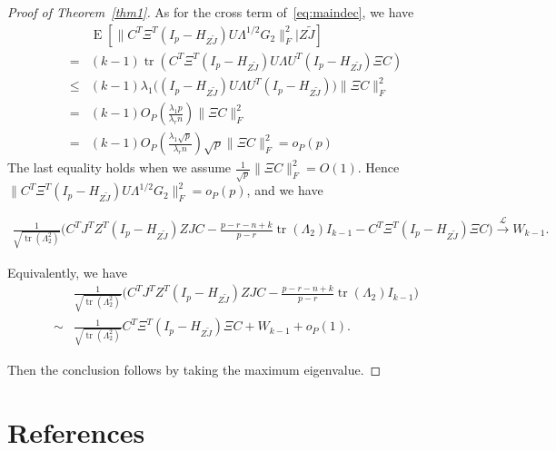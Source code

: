 \documentclass[review]{elsarticle}
\DeclareMathOperator{\mytr}{tr}
\DeclareMathOperator{\myE}{E}
\theoremstyle{plain}
\theoremstyle{definition}
\theoremstyle{remark}
\begin{document}
\begin{proof}[\textrm{Proof of Theorem~\ref{thm1}}]
As for the cross term of~\eqref{eq:maindec}, we have
$$
\begin{aligned}
    &\myE [\|C^T \Xi^T (I_p -H_{Z\tilde{J}})U\Lambda^{1/2}G_2\|_F^2|Z\tilde{J}]\\
    = &
    (k-1)\mytr(C^T \Xi^T (I_p -H_{Z\tilde{J}})U\Lambda U^T (I_p -H_{Z\tilde{J}})\Xi C)\\
    \leq &
    (k-1)\lambda_1\big((I_p -H_{Z\tilde{J}})U\Lambda U^T (I_p -H_{Z\tilde{J}})\big)\|\Xi C\|^2_F\\
    = &
    (k-1) O_P(\frac{\lambda_1 p}{\lambda_r n})  \|\Xi C\|^2_F\\
    = &
    (k-1) O_P(\frac{\lambda_1 \sqrt{p}}{\lambda_r n}) \sqrt{p}  \|\Xi C\|^2_F=o_P(p)
\end{aligned}
$$
The last equality holds when we assume $\frac{1}{\sqrt{p}}\|\Xi C\|_F^2=O(1)$. Hence $\|C^T \Xi^T (I_p -H_{Z\tilde{J}})U\Lambda^{1/2}G_2\|_F^2=o_P(p)$, and we have

$$
\begin{aligned}
\frac{1}{\sqrt{\mytr(\Lambda_2^2)}}
    \big( C^TJ^T Z^T(I_p-H_{Z\tilde J}) ZJC
    -\tfrac{p-r-n+k}{p-r}\mytr(\Lambda_2)I_{k-1} -C^T \Xi^T (I_p-H_{Z\tilde{J}})\Xi C\big)
\xrightarrow{\mathcal{L}} W_{k-1}.
\end{aligned}
$$

    Equivalently, we have
    $$
    \begin{aligned}
        &\frac{1}{\sqrt{\mytr(\Lambda_2^2)}} {\Big(C^TJ^T Z^T(I_p-H_{Z\tilde J}) ZJC- \frac{p-r-n+k}{p-r}\mytr(\Lambda_2)I_{k-1}}\Big)\\
        \sim&
\frac{1}{\sqrt{\mytr(\Lambda_2^2)}} C^T \Xi^T (I_p-H_{Z\tilde{J}})\Xi C
        +W_{k-1}+o_P(1).
    \end{aligned}
    $$

    Then the conclusion follows by taking the maximum eigenvalue.
\end{proof}






\section*{References}


\end{document}

